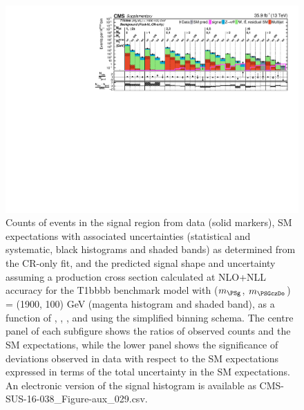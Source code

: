 \begin{figure}[p]
    \begin{center}
        \includegraphics[width=1.00\textwidth]{Supplementary/CMS-SUS-16-038_Figure-aux_029.pdf}
  \caption{Counts of events in the signal region from data (solid markers), SM expectations
    with associated uncertainties (statistical and systematic, black
    histograms and shaded bands) as determined from the CR-only fit,
    and the predicted signal shape and uncertainty assuming a production cross
    section calculated at NLO+NLL accuracy for the
        T1bbbb benchmark model with ($m_{\PSg}$, $m_{\PSGczDo}$) = (1900, 100) GeV
    (magenta histogram and shaded band),
    as a function of \njet, \nb, \scalht, and \mht using the simplified binning schema.
    The centre panel of each subfigure shows the ratios of
    observed counts and the SM expectations, while the lower panel
    shows the significance of deviations observed in data with respect
    to the SM expectations expressed in terms of the total uncertainty
    in the SM expectations.  
	An electronic version of the signal histogram is available as CMS-SUS-16-038\_Figure-aux\_029.csv.
        }
        \label{fig:T1bbbb_1900_100_MR_sig}
    \end{center}
\end{figure}

